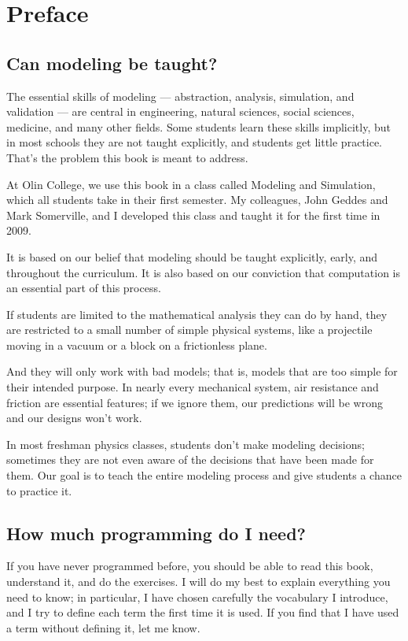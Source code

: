 \documentclass[12pt]{book}
\theoremstyle{exercise}
\begin{document}
\fi

\chapter{Preface}
\label{preface}


\section{Can modeling be taught?}

The essential skills of modeling --- abstraction, analysis, simulation, and validation --- are central in engineering, natural sciences, social sciences, medicine, and many other fields.  Some students learn these skills implicitly, but in most schools they are not taught explicitly, and students get little practice.  That's the problem this book is meant to address.  

At Olin College, we use this book in a class called Modeling and Simulation, which all students take in their first semester.  My colleagues, John Geddes and Mark Somerville, and I developed this class and taught it for the first time in 2009.

It is based on our belief that modeling should be taught explicitly, early, and throughout the curriculum.  It is also based on our conviction that computation is an essential part of this process.

If students are limited to the mathematical analysis they can do by hand, they are restricted to a small number of simple physical systems, like a projectile moving in a vacuum or a block on a frictionless plane.

And they will only work with bad models; that is, models that are too simple for their intended purpose.  In nearly every mechanical system, air resistance and friction are essential features; if we ignore them, our predictions will be wrong and our designs won't work.

In most freshman physics classes, students don't make modeling decisions; sometimes they are not even aware of the decisions that have been made for them.  Our goal is to teach the entire modeling process and give students a chance to practice it.


\section{How much programming do I need?}

If you have never programmed before, you should be able to read this book, understand it, and do the exercises.  I will do my best to explain everything you need to know; in particular, I have chosen carefully the vocabulary I introduce, and I try to define each term the first time it is used.  If you find that I have used a term without defining it, let me know.
\end{document}
